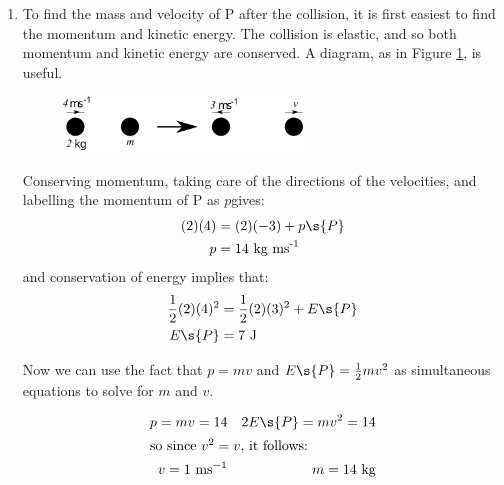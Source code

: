 \begin{problem}[AO1984PIQ1a]
{\begin{enumerate}
In order to work out the maximum tension; we need to relate the tension in the elastic to the extension: the force required to stretch the elastic is $\vtr{F} = k\vtr{x}$ where $k$ is commonly called the spring constant, and so the tension, which is equal in magnitude but opposite in sign, must be $kx$. The constant $k$ can be found by considering the energy stored $E = \frac{1}{2}kx^{2}$ and we know both $E$ and $x$:
\begin{equation*} k = \frac{E}{x^{2}} = \frac{16}{(0.5)^{2}} \textrm{ N m}^{-1} = 128 \textrm{ N m}^{-1} \end{equation*}
and so the tension, which is maximum at the maximum extension, is:
\begin{equation*} T\s{max} = kx = (128)(0.5) \textrm{ N} = 64 \textrm{ N} \end{equation*}
	\item To find the mass and velocity of P after the collision, it is first easiest to find the momentum and kinetic energy. The collision is elastic, and so both momentum and kinetic energy are conserved. A diagram, as in Figure \ref{fig:Dynamics_PQ_mass}, is useful.
	
\begin{figure}[h]
	\centering
	\includegraphics[width=0.6\textwidth]{../../../figures/Dynamics_PQ_mass}
	\caption{}\label{fig:Dynamics_PQ_mass}
\end{figure}

Conserving momentum, taking care of the directions of the velocities, and labelling the momentum of P as $p$gives:
\begin{align*} 
(2)(4) &= (2)(-3) + p\s{P}  \\ 
p &= 14 \text{ kg ms}^{\text{-1}}
\end{align*}
and conservation of energy implies that:
\begin{align*} 
\frac{1}{2}(2)(4)^{2} &= \frac{1}{2}(2)(3)^{2} + E\s{P}  \\
 E\s{P} &= 7 \text{ J} 
 \end{align*}

Now we can use the fact that $p = mv$ and $E\s{P} = \frac{1}{2}mv^{2}$ as simultaneous equations to solve for $m$ and $v$.

\begin{align*} 
p = mv = 14 &&  2E\s{P} = mv^{2} = 14 \\ 
\intertext{so since $v^{2} = v$, it follows:} v = 1 \text{ ms}^{-1} && m = 14 \text{ kg} 
\end{align*}


\end{enumerate}}
\end{problem}
